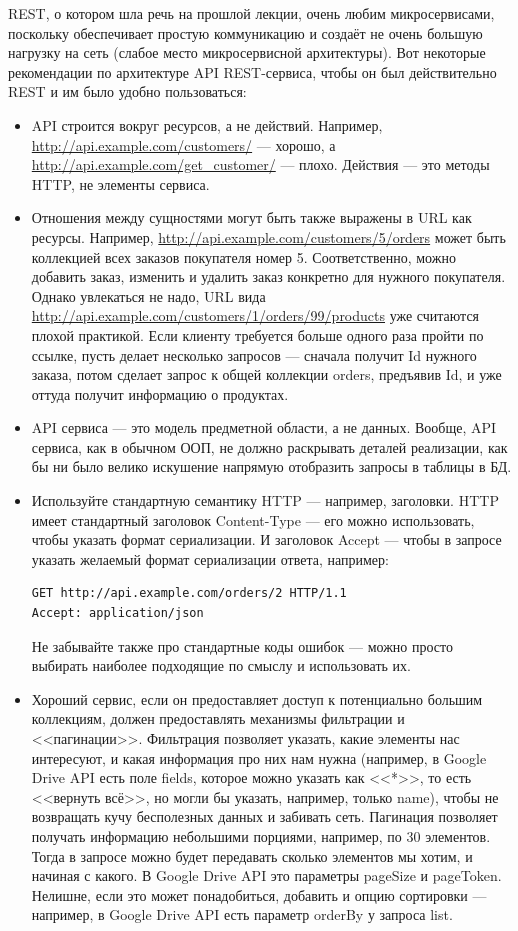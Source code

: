 \documentclass[a5paper]{article}
\begin{document}
REST, о котором шла речь на прошлой лекции, очень любим микросервисами, поскольку обеспечивает простую коммуникацию и создаёт не очень большую нагрузку на сеть (слабое место микросервисной архитектуры). Вот некоторые рекомендации по архитектуре API REST-сервиса, чтобы он был действительно REST и им было удобно пользоваться:

\begin{itemize}
    \item API строится вокруг ресурсов, а не действий. Например, \url{http://api.example.com/customers/} --- хорошо, а \url{http://api.example.com/get_customer/} --- плохо. Действия --- это методы HTTP, не элементы сервиса.
    \item Отношения между сущностями могут быть также выражены в URL как ресурсы. Например, \url{http://api.example.com/customers/5/orders} может быть коллекцией всех заказов покупателя номер 5. Соответственно, можно добавить заказ, изменить и удалить заказ конкретно для нужного покупателя. Однако увлекаться не надо, URL вида \url{http://api.example.com/customers/1/orders/99/products} уже считаются плохой практикой. Если клиенту требуется больше одного раза пройти по ссылке, пусть делает несколько запросов --- сначала получит Id нужного заказа, потом сделает запрос к общей коллекции orders, предъявив Id, и уже оттуда получит информацию о продуктах.
    \item API сервиса --- это модель предметной области, а не данных. Вообще, API сервиса, как в обычном ООП, не должно раскрывать деталей реализации, как бы ни было велико искушение напрямую отобразить запросы в таблицы в БД.
    \item Используйте стандартную семантику HTTP --- например, заголовки. HTTP имеет стандартный заголовок Content-Type --- его можно использовать, чтобы указать формат сериализации. И заголовок Accept --- чтобы в запросе указать желаемый формат сериализации ответа, например:
        \begin{verbatim}
GET http://api.example.com/orders/2 HTTP/1.1
Accept: application/json
        \end{verbatim}
        Не забывайте также про стандартные коды ошибок --- можно просто выбирать наиболее подходящие по смыслу и использовать их.
    \item Хороший сервис, если он предоставляет доступ к потенциально большим коллекциям, должен предоставлять механизмы фильтрации и <<пагинации>>. Фильтрация позволяет указать, какие элементы нас интересуют, и какая информация про них нам нужна (например, в Google Drive API есть поле fields, которое можно указать как <<*>>, то есть <<вернуть всё>>, но могли бы указать, например, только name), чтобы не возвращать кучу бесполезных данных и забивать сеть. Пагинация позволяет получать информацию небольшими порциями, например, по 30 элементов. Тогда в запросе можно будет передавать сколько элементов мы хотим, и начиная с какого. В Google Drive API это параметры pageSize и pageToken. Нелишне, если это может понадобиться, добавить и опцию сортировки --- например, в Google Drive API есть параметр orderBy у запроса list.

\end{itemize}
\end{document}
